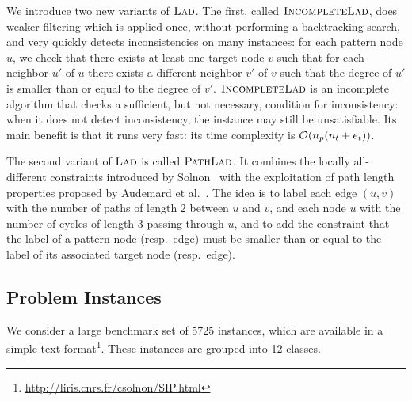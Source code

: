 \documentclass{llncs}
\newcommand{\LAD}{$\textsc{Lad}$\xspace}
\newcommand{\IncompleteLAD}{$\textsc{IncompleteLad}$\xspace}
\newcommand{\PathLAD}{$\textsc{PathLad}$\xspace}
\begin{document}
We introduce two new variants of \LAD. The first, called \IncompleteLAD, does weaker
filtering which is applied once, without performing a backtracking search, and very quickly
detects inconsistencies on many instances: for each pattern node $u$, we check that there exists at
least one target node $v$ such that for each neighbor $u'$ of $u$ there exists a different neighbor
$v'$ of $v$ such that the degree of $u'$ is smaller than or equal to the degree of $v'$.
\IncompleteLAD is an incomplete algorithm that checks a sufficient, but not
necessary, condition for inconsistency: when it does not detect inconsistency,
the instance may still be unsatisfiable. Its main benefit is that it runs very
fast: its time complexity is ${\cal O}(n_p(n_t+e_t))$.

The second variant of \LAD is called \PathLAD. It combines the locally all-different constraints
introduced by Solnon~\cite{Solnon:2010} with the exploitation of path length properties proposed by
Audemard et al.~\cite{Audemard:2014}. The idea is to label each edge $(u,v)$ with the number of
paths of length 2 between $u$ and $v$, and each node $u$ with the number of cycles of length 3
passing through $u$, and to add the constraint that the label of a pattern node (resp.\ edge) must
be smaller than or equal to the label of its associated target node (resp.\ edge).


\subsection{Problem Instances}

We consider a large benchmark set of 5725 instances, which are available in a simple text
format\footnote{\url{http://liris.cnrs.fr/csolnon/SIP.html}}. These instances are grouped into 12
classes.
\end{document}
